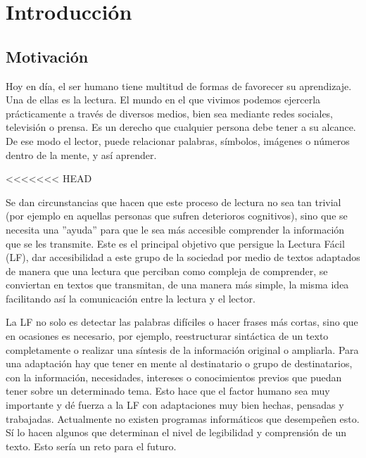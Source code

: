 \chapter{Introducción}
\label{cap:introduccion}


\section{Motivación}
Hoy en día, el ser humano tiene multitud de formas de favorecer su aprendizaje. Una de ellas es la lectura. El mundo en el que vivimos podemos ejercerla prácticamente a través de diversos medios, bien sea mediante redes sociales, televisión o prensa. Es un derecho que cualquier persona debe tener a su alcance. De ese modo el lector, puede relacionar palabras, símbolos, imágenes o números dentro de la mente, y así aprender.

<<<<<<< HEAD
 \setlength{\parskip}{10pt}

 Se dan circunstancias que hacen que este proceso de lectura no sea tan trivial (por ejemplo en aquellas personas que sufren deterioros cognitivos), sino que se necesita una ''ayuda'' para que le sea más accesible comprender la información que se les transmite. Este es el principal objetivo que persigue la Lectura Fácil (LF), dar accesibilidad a este grupo de la sociedad por medio de textos adaptados de manera que una lectura que perciban como compleja de comprender, se conviertan en textos que transmitan, de una manera más simple, la misma idea facilitando así la comunicación entre la lectura y el lector.
 
 \setlength{\parskip}{10pt}
 
La LF no solo es detectar las palabras difíciles o hacer frases más cortas, sino que en ocasiones es necesario, por ejemplo, reestructurar sintáctica de un texto completamente o realizar una síntesis de la información original o ampliarla. Para una adaptación hay que tener en mente al destinatario o grupo de destinatarios, con la información, necesidades, intereses o conocimientos previos que puedan tener sobre un determinado tema. Esto hace que el factor humano sea muy importante y dé fuerza a la LF con adaptaciones muy bien hechas, pensadas y trabajadas. Actualmente no existen programas informáticos que desempeñen esto. Sí lo hacen algunos que determinan el nivel de legibilidad y comprensión de un texto. Esto sería un reto para el futuro.  

